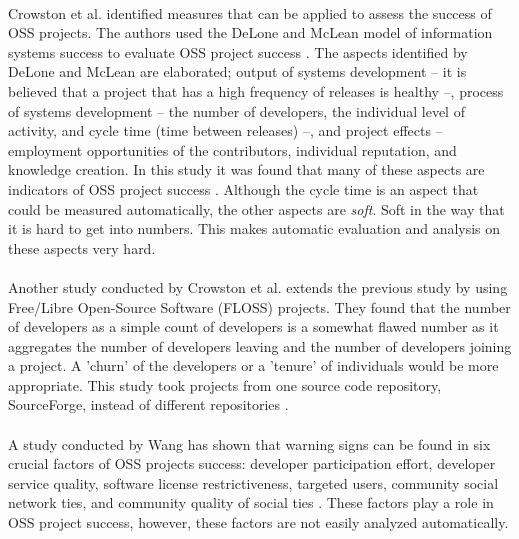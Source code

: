 \paragraph{}
Crowston et al. identified measures that can be applied to assess the success of
OSS projects. The authors used the DeLone and McLean model of information
systems success to evaluate OSS project success \cite{delone1992}. The aspects
identified by DeLone and McLean are elaborated; output of systems development -- it is
believed that a project that has a high frequency of releases is healthy --,
process of systems development -- the number of developers, the individual
level of activity, and cycle time (time between releases) --, and
project effects -- employment opportunities of the contributors, individual
reputation, and knowledge creation. In this study it was found that many of
these aspects are indicators of OSS project success \cite{crowston2003}.
Although the cycle time is an aspect that could be measured automatically, the
other aspects are \emph{soft}\rm. Soft in the way that it is hard to get into
numbers. This makes automatic evaluation and analysis on these aspects very
hard.

\paragraph{}
Another study conducted by Crowston et al. extends the previous study by using
Free/Libre Open-Source Software (FLOSS) projects. They found that the number of
developers as a simple count of developers is a somewhat flawed number as
it aggregates the number of developers leaving and the number of developers
joining a project. A 'churn' of the developers or a 'tenure' of individuals
would be more appropriate.
This study took projects from one source code repository,
SourceForge, instead of different repositories \cite{crowston2006}.

\paragraph{}
A study conducted by Wang has shown that warning signs can be found in
six crucial factors of OSS projects success: developer participation effort,
developer service quality, software license restrictiveness, targeted users,
community social network ties, and community quality of social ties
\cite{wang2012}.
These factors play a role in OSS project success, however, these factors are not
easily analyzed automatically.


